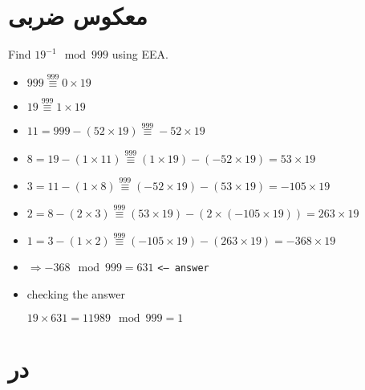 \documentclass{article}
\begin{document}
\section{معکوس ضربی}
\begin{latin}
Find $19^{-1}  \mod 999$ using EEA.

\begin{itemize}
\item $999 \overset{999}{\equiv} 0 \times 19$
\item $19 \overset{999}{\equiv} 1 \times 19$
\item $11 = 999 - (52 \times 19) \overset{999}{\equiv} -52 \times 19$
\item $8 = 19 - (1 \times 11) \overset{999}{\equiv} (1\times19) - (-52\times19) = 53\times19$

\item $3 = 11 - (1\times8) \overset{999}{\equiv}
(-52\times19)-(53\times19) = -105\times19$

\item $2 = 8 - (2\times3) \overset{999}{\equiv}
(53\times19) - (2\times(-105\times19)) = 263\times19$

\item $1 = 3 - (1\times2) \overset{999}{\equiv}
(-105\times19)-(263\times19) = -368\times19$

\item $\Rightarrow -368 \mod 999 = 631$ \texttt{<-- answer}

\item checking the answer

$19 \times 631 = 11989 \mod 999 = 1$

\end{itemize}
\end{latin}

\newpage
\section{در }
\end{document}
